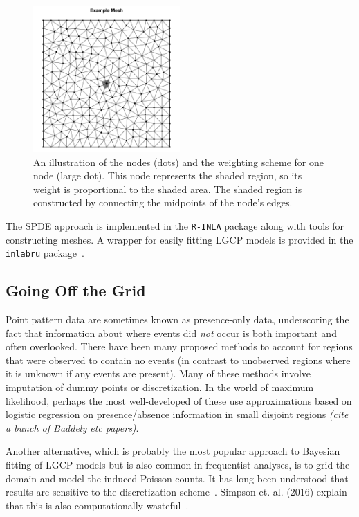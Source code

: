 \documentclass[]{interact}
\begin{document}
\begin{figure}[p]\centering
\includegraphics[width=0.5\textwidth]{figures/dual.pdf}
\caption{An illustration of the nodes (dots) and the weighting scheme for one
node (large dot). This node represents the shaded region, so its weight is
proportional to the shaded area. The shaded region is constructed by connecting
the midpoints of the node's edges.}
\label{dual}
\end{figure}

The SPDE approach is implemented in the \texttt{R-INLA} package along with
tools for constructing meshes. A wrapper for easily fitting LGCP models is
provided in the \texttt{inlabru} package~\cite{inlabru}.


\subsection{Going Off the Grid}

Point pattern data are sometimes known as presence-only data, underscoring
the fact that information about where events did \emph{not} occur is both
important and often overlooked. There have been many proposed methods to
account for regions that were observed to contain no events (in contrast to
unobserved regions where it is unknown if any events are present). Many of
these methods involve imputation of dummy points or discretization. In the
world of maximum likelihood, perhaps the most well-developed of these use
approximations based on logistic regression on presence/absence information in
small disjoint regions {\it (cite a bunch of Baddely etc papers)}.

Another alternative, which is probably the most popular approach to Bayesian
fitting of LGCP models but is also common in frequentist analyses, is to grid
the domain and model the induced Poisson counts. It has long been understood
that results are sensitive to the discretization scheme~\cite{brixmoeller}.
Simpson et. al. (2016) explain that this is also computationally
wasteful~\cite{simpsonetal}.
\end{document}
